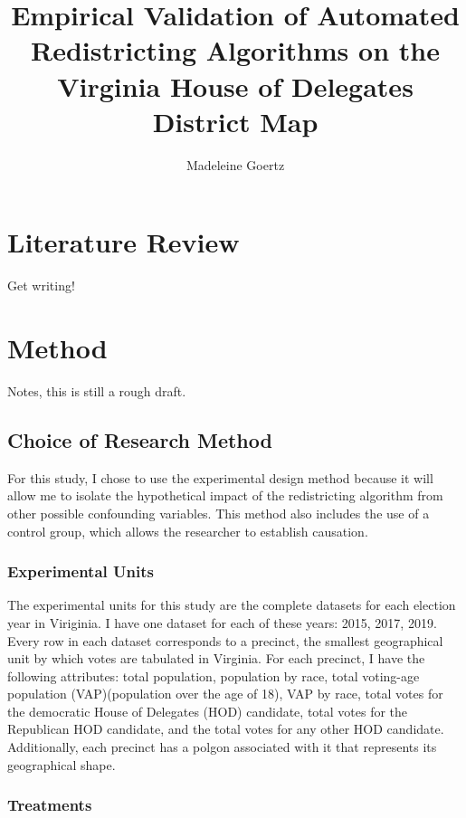 \documentclass[stu, floatsintext]{apa7}
\title{Empirical Validation of Automated Redistricting Algorithms on the Virginia House of Delegates District Map}
\author{Madeleine Goertz}
\affiliation{International Community School}
\begin{document}
\maketitle


\section{Literature Review}

Get writing!

\section{Method}

Notes, this is still a rough draft. 

\subsection{Choice of Research Method}

For this study, I chose to use the experimental design method because it will allow me to isolate the hypothetical impact of the redistricting algorithm from other possible confounding variables. This method also includes the use of a control group, which allows the researcher to establish causation. 

\subsubsection{Experimental Units}

The experimental units for this study are the complete datasets for each election year in Viriginia. I have one dataset for each of these years: 2015, 2017, 2019. Every row in each dataset corresponds to a precinct, the smallest geographical unit by which votes are tabulated in Virginia. For each precinct, I have the following attributes: total population, population by race, total voting-age population (VAP)(population over the age of 18), VAP by race, total votes for the democratic House of Delegates (HOD) candidate, total votes for the Republican HOD candidate, and the total votes for any other HOD candidate. Additionally, each precinct has a polgon associated with it that represents its geographical shape. 

\subsubsection{Treatments}
\end{document}
